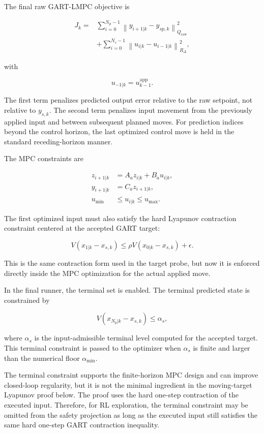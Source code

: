 \documentclass[11pt]{article}
\begin{document}
The final raw GART-LMPC objective is


\[
\begin{aligned}
J_k
=
&\sum_{i=0}^{N_p-1}
\left\|y_{i+1|k}-y_{sp,k}\right\|_{Q_{\mathrm{raw}}}^{2}
\\
&+
\sum_{i=0}^{N_c-1}
\left\|u_{i|k}-u_{i-1|k}\right\|_{R_{\Delta}}^{2},
\end{aligned}
\]

with


\[
u_{-1|k}=u_{k-1}^{\mathrm{app}}.
\]

The first term penalizes predicted output error relative to the raw setpoint, not relative to $y_{s,k}$. The second term penalizes input movement from the previously applied input and between subsequent planned moves. For prediction indices beyond the control horizon, the last optimized control move is held in the standard receding-horizon manner.


The MPC constraints are


\[
\begin{aligned}
z_{i+1|k} &= A_a z_{i|k}+B_a u_{i|k}, \\
y_{i+1|k} &= C_a z_{i+1|k}, \\
u_{\min} &\le u_{i|k}\le u_{\max}.
\end{aligned}
\]

The first optimized input must also satisfy the hard Lyapunov contraction constraint centered at the accepted GART target:


\[
V(x_{1|k}-x_{s,k})
\le
\rho V(x_{0|k}-x_{s,k})+\epsilon.
\]

This is the same contraction form used in the target probe, but now it is enforced directly inside the MPC optimization for the actual applied move.


In the final runner, the terminal set is enabled. The terminal predicted state is constrained by


\[
V(x_{N_p|k}-x_{s,k})\le \alpha_s,
\]

where $\alpha_s$ is the input-admissible terminal level computed for the accepted target. This terminal constraint is passed to the optimizer when $\alpha_s$ is finite and larger than the numerical floor $\alpha_{\min}$.

The terminal constraint supports the finite-horizon MPC design and can improve closed-loop regularity, but it is not the minimal ingredient in the moving-target Lyapunov proof below. The proof uses the hard one-step contraction of the executed input. Therefore, for RL exploration, the terminal constraint may be omitted from the safety projection as long as the executed input still satisfies the same hard one-step GART contraction inequality.
\end{document}
